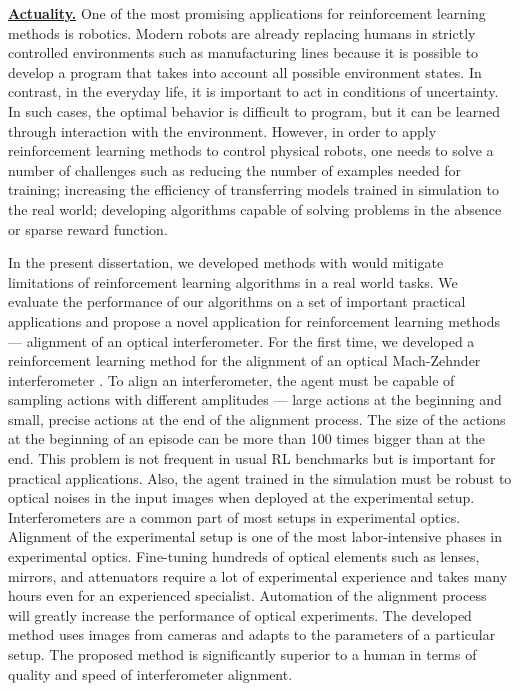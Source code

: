 \underline{\textbf{Actuality.}}  One of the most promising applications for reinforcement learning methods is robotics. Modern robots are already replacing humans in strictly controlled environments such as manufacturing lines because it is possible to develop a program that takes into account all possible environment states. In contrast, in the everyday life, it is important to act in conditions of uncertainty. In such cases, the optimal behavior is difficult to program, but it can be learned through interaction with the environment. However, in order to apply reinforcement learning methods to control physical robots, one needs to solve a number of challenges such as reducing the number of examples needed for training; increasing the efficiency of transferring models trained in simulation to the real world; developing algorithms capable of solving problems in the absence or sparse reward function. 

In the present dissertation, we developed methods with would mitigate limitations of reinforcement learning algorithms in a real world tasks. We evaluate the performance of our algorithms on a set of important practical applications and propose a novel application for reinforcement learning methods --- alignment of an optical interferometer. 
For the first time, we developed a reinforcement learning method for the alignment of an optical Mach-Zehnder interferometer \cite{interferobot, v2}. To align an interferometer, the agent must be capable of sampling actions with different amplitudes --- large actions at the beginning and small, precise actions at the end of the alignment process. The size of the actions at the beginning of an episode can be more than 100 times bigger than at the end. This problem is not frequent in usual RL benchmarks but is important for practical applications. Also, the agent trained in the simulation must be robust to optical noises in the input images when deployed at the experimental setup. Interferometers are a common part of most setups in experimental optics. Alignment of the experimental setup is one of the most labor-intensive phases in experimental optics. Fine-tuning hundreds of optical elements such as lenses, mirrors, and attenuators require a lot of experimental experience and takes many hours even for an experienced specialist. Automation of the alignment process will greatly increase the performance of optical experiments. The developed method uses images from cameras and adapts to the parameters of a particular setup. The proposed method is significantly superior to a human in terms of quality and speed of interferometer alignment.

